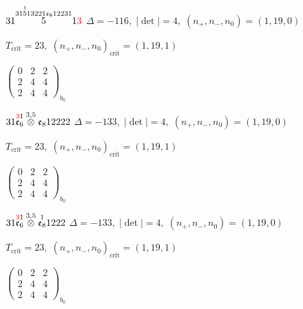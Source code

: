 \documentclass[10pt]{article}
\begin{document}
\smallskip

$31\overset{31\overset{1}{5}13221\mathfrak{e}_812231}{5}1\textcolor{red}{3}$ \quad $\Delta=-116,\; |\det|=4,\; (n_+,n_-,n_0)=(1,19,0)$

\hspace{1em}$T_{\text{crit}}=23,\; (n_+,n_-,n_0)_{\text{crit}}=(1,19,1)$

\hspace{2em}$\left(\begin{smallmatrix}0 & 2 & 2 \\ 2 & 4 & 4 \\ 2 & 4 & 4\end{smallmatrix}\right)_{\!b_0}$

\smallskip

$31\overset{\textcolor{red}{3}1}{\mathfrak{e}_6}\overset{3,5}{\otimes}\mathfrak{e}_812222$ \quad $\Delta=-133,\; |\det|=4,\; (n_+,n_-,n_0)=(1,19,0)$

\hspace{1em}$T_{\text{crit}}=23,\; (n_+,n_-,n_0)_{\text{crit}}=(1,19,1)$

\hspace{2em}$\left(\begin{smallmatrix}0 & 2 & 2 \\ 2 & 4 & 4 \\ 2 & 4 & 4\end{smallmatrix}\right)_{\!b_0}$

\smallskip

$31\overset{\textcolor{red}{3}1}{\mathfrak{e}_6}\overset{3,5}{\otimes}\overset{1}{\mathfrak{e}_8}1222$ \quad $\Delta=-133,\; |\det|=4,\; (n_+,n_-,n_0)=(1,19,0)$

\hspace{1em}$T_{\text{crit}}=23,\; (n_+,n_-,n_0)_{\text{crit}}=(1,19,1)$

\hspace{2em}$\left(\begin{smallmatrix}0 & 2 & 2 \\ 2 & 4 & 4 \\ 2 & 4 & 4\end{smallmatrix}\right)_{\!b_0}$

\smallskip
\end{document}
